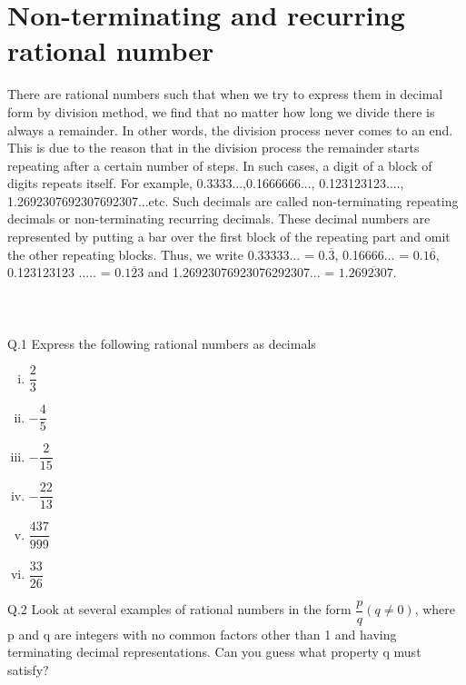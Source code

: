 \section{Non-terminating and recurring rational number}
There are rational numbers such that when we try to express them in
decimal form by
division method, we find that no matter how long we divide there is
always a remainder. In
other words, the division process never comes to an end. This is due to
the reason that in the
division process the remainder starts repeating after a certain number
of steps. In such cases,
a digit of a block of digits repeats itself. For example,
0.3333...,0.1666666...,
0.123123123...., 1.2692307692307692307...etc. Such decimals are called
non-terminating
repeating decimals or non-terminating recurring decimals. These decimal
numbers are
represented by putting a bar over the first block of the repeating part
and omit the other
repeating blocks. Thus, we write 0.33333... = $0.\overline{3}$, 0.16666... =
$0.1\overline{6}$, 0.123123123 ..... = $0.\overline{123}$ and
1.26923076923076292307... = $1.2\overline{692307}$.\\\\
\\\\
Q.1 Express the following rational numbers as decimals
\begin{multicols}{5}
\begin{enumerate}[(i)]
 \item $\dfrac{2}{3}$
 \item $-\dfrac{4}{5}$
 \item $-\dfrac{2}{15}$
 \item $-\dfrac{22}{13}$
 \item $\dfrac{437}{999}$
 \item $\dfrac{33}{26}$
\end{enumerate}
\end{multicols}
\noindent Q.2 Look at several examples of rational numbers in the form
$\dfrac{p}{q} (q \neq 0)$, where p and q are integers with no common
factors other than 1 and having terminating decimal representations. Can
you guess what property q must satisfy?
